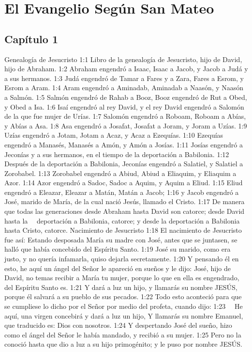 \chapter{El Evangelio Según San Mateo}

\section*{Capítulo 1}
Genealogía de Jesucristo 
 1:1 Libro de la genealogía de Jesucristo, hijo de David, hijo de Abraham. 
1:2 Abraham engendró a Isaac, Isaac a Jacob, y Jacob a Judá y a sus hermanos. 
1:3 Judá engendró de Tamar a Fares y a Zara, Fares a Esrom, y Esrom a Aram. 
1:4 Aram engendró a Aminadab, Aminadab a Naasón, y Naasón a Salmón. 
1:5 Salmón engendró de Rahab a Booz, Booz engendró de Rut a Obed, y Obed a Isa. 
1:6 Isaí engendró al rey David, y el rey David engendró a Salomón de la que fue mujer de Urías. 
1:7 Salomón engendró a Roboam, Roboam a Abías, y Abías a Asa. 
1:8 Asa engendró a Josafat, Josafat a Joram, y Joram a Uzías. 
1:9 Uzías engendró a Jotam, Jotam a Acaz, y Acaz a Ezequías. 
1:10 Ezequías engendró a Manasés, Manasés a Amón, y Amón a Josías. 
1:11 Josías engendró a Jeconías y a sus hermanos, en el tiempo de la deportación a Babilonia. 
1:12 Después de la deportación a Babilonia, Jeconías engendró a Salatiel, y Salatiel a Zorobabel. 
1:13 Zorobabel engendró a Abiud, Abiud a Eliaquim, y Eliaquim a Azor. 
1:14 Azor engendró a Sadoc, Sadoc a Aquim, y Aquim a Eliud. 
1:15 Eliud engendró a Eleazar, Eleazar a Matán, Matán a Jacob; 
1:16 y Jacob engendró a José, marido de María, de la cual nació Jesús, llamado el Cristo. 
1:17 De manera que todas las generaciones desde Abraham hasta David son catorce; desde David hasta la   deportación a Babilonia, catorce; y desde la deportación a Babilonia hasta Cristo, catorce. 
Nacimiento de Jesucristo 
1:18 El nacimiento de Jesucristo fue así: Estando desposada María su madre con José, antes que se juntasen, se halló que había concebido del Espíritu Santo. 
1:19 José su marido, como era justo, y no quería infamarla, quiso dejarla secretamente. 
1:20 Y pensando él en esto, he aquí un ángel del Señor le apareció en sueños y le dijo: José, hijo de David, no temas recibir a María tu mujer, porque lo que en ella es engendrado, del Espíritu Santo es. 
1:21 Y dará a luz un hijo, y llamarás su nombre JESÚS, porque él salvará a su pueblo de sus pecados. 
1:22 Todo esto aconteció para que se cumpliese lo dicho por el Señor por medio del profeta, cuando dijo: 
1:23   He aquí, una virgen concebirá y dará a luz un hijo, 
Y llamarás su nombre Emanuel, 
que traducido es: Dios con nosotros. 
1:24 Y despertando José del sueño, hizo como el ángel del Señor le había mandado, y recibió a su mujer. 
1:25 Pero no la conoció hasta que dio a luz a su hijo primogénito; y le puso por nombre JESÚS. 
